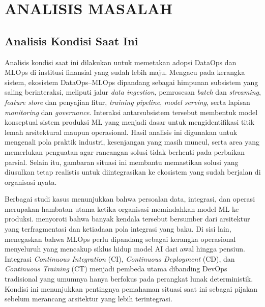\chapter{ANALISIS MASALAH}
\label{chap:analisis_masalah}

\section{Analisis Kondisi Saat Ini}

Analisis kondisi saat ini dilakukan untuk memetakan adopsi DataOps dan MLOps di institusi finansial yang sudah lebih maju. Mengacu pada kerangka sistem, ekosistem DataOps--MLOps dipandang sebagai himpunan subsistem yang saling berinteraksi, meliputi jalur \textit{data ingestion}, pemrosesan \textit{batch} dan \textit{streaming}, \textit{feature store} dan penyajian fitur, \textit{training pipeline}, \textit{model serving}, serta lapisan \textit{monitoring} dan \textit{governance}. Interaksi antarsubsistem tersebut membentuk model konseptual sistem produksi ML yang menjadi dasar untuk mengidentifikasi titik lemah arsitektural maupun operasional. Hasil analisis ini digunakan untuk mengenali pola praktik industri, kesenjangan yang masih muncul, serta area yang memerlukan penguatan agar rancangan solusi tidak berhenti pada perbaikan parsial. Selain itu, gambaran situasi ini membantu memastikan solusi yang diusulkan tetap realistis untuk diintegrasikan ke ekosistem yang sudah berjalan di organisasi nyata.

Berbagai studi kasus menunjukkan bahwa persoalan data, integrasi, dan operasi merupakan hambatan utama ketika organisasi memindahkan model ML ke produksi. \textcite{paleyes2022challenges} menyoroti bahwa banyak kendala tersebut bersumber dari arsitektur yang terfragmentasi dan ketiadaan pola integrasi yang baku. Di sisi lain, \textcite{vangala2022mlops} menegaskan bahwa MLOps perlu dipandang sebagai kerangka operasional menyeluruh yang mencakup siklus hidup model AI dari awal hingga pensiun. Integrasi \textit{Continuous Integration} (CI), \textit{Continuous Deployment} (CD), dan \textit{Continuous Training} (CT) menjadi pembeda utama dibanding DevOps tradisional yang umumnya hanya berfokus pada perangkat lunak deterministik. Kondisi ini menunjukkan pentingnya pemahaman situasi saat ini sebagai pijakan sebelum merancang arsitektur yang lebih terintegrasi.

